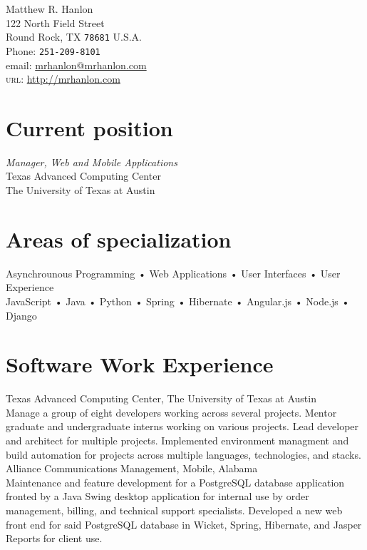 \documentclass[10pt, a4paper]{article}
\newcommand{\years}[1]{\marginnote{\scriptsize #1}}
\begin{document}
{\LARGE Matthew R. Hanlon}\\[.5cm]
122 North Field Street\\
Round Rock, TX \texttt{78681}
U.S.A.\\[.1cm]
Phone: \texttt{251-209-8101}\\[.1cm]
email: \href{mailto:mrhanlon@mrhanlon.com}{mrhanlon@mrhanlon.com}\\
\textsc{url}: \href{http://mrhanlon.com}{http://mrhanlon.com}

\vfill{}

\section*{Current position}
\emph{Manager, Web and Mobile Applications}\\
Texas Advanced Computing Center\\
The University of Texas at Austin

\section*{Areas of specialization}
Asynchrounous Programming • Web Applications • User Interfaces • User Experience\\
JavaScript • Java • Python • Spring • Hibernate • Angular.js • Node.js • Django

\section*{Software Work Experience}
\noindent
\years{2010-present}Texas Advanced Computing Center, The University of Texas at Austin\\
{\small Manage a group of eight developers working across several projects. Mentor graduate and undergraduate interns working on various projects. Lead developer and architect for multiple projects. Implemented environment managment and build automation for projects across multiple languages, technologies, and stacks.}\\

\years{2007-2010}Alliance Communications Management, Mobile, Alabama\\
{\small Maintenance and feature development for a PostgreSQL database application fronted by a Java Swing desktop application for internal use by order management, billing, and technical support specialists. Developed a new web front end for said PostgreSQL database in Wicket, Spring, Hibernate, and Jasper Reports for client use.}
\end{document}
